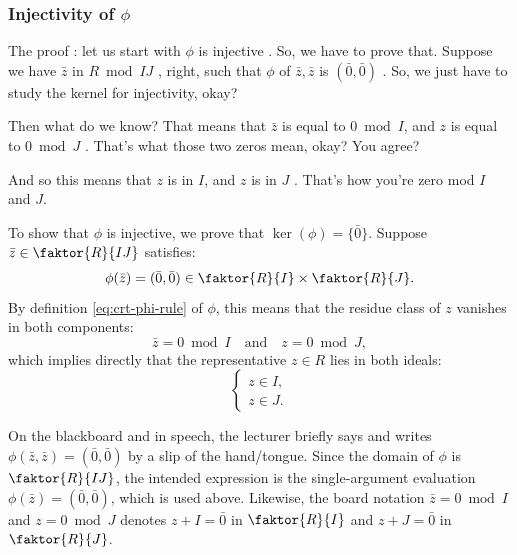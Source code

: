 \begin{proofWrapper}

\subsubsection{Injectivity of \texorpdfstring{$\phi$}{phi}}

\begin{speech}[00:05:59 - 00:07:08]
The proof : let us start with $\phi$ is injective . So, we have to prove that. Suppose we have $\bar{z}$ in $R \bmod IJ$ , right, such that $\phi$ of $\bar{z}, \bar{z}$ is $(\bar{0}, \bar{0})$ . So, we just have to study the kernel for injectivity, okay?

Then what do we know? That means that $\bar{z}$ is equal to $0 \bmod I$, and $z$ is equal to $0 \bmod J$ . That's what those two zeros mean, okay? You agree?

And so this means that $z$ is in $I$, and $z$ is in $J$ . That's how you're zero mod $I$ and $J$.
\end{speech}

\begin{content}
To show that $\phi$ is injective, we prove that $\ker(\phi) = \{\bar{0}\}$. Suppose $\bar{z} \in \faktor{R}{IJ}$ satisfies:
\[
\phi(\bar{z}) = (\bar{0}, \bar{0}) \in \faktor{R}{I} \times \faktor{R}{J}.
\]
By definition \eqref{eq:crt-phi-rule} of $\phi$, this means that the residue class of $z$ vanishes in both components:
\[
\bar{z} = 0 \bmod I \quad \text{and} \quad z = 0 \bmod J,
\]
which implies directly that the representative $z \in R$ lies in both ideals:
\begin{equation}\label{eq:z-in-i-and-j}
\begin{cases}
z \in I, \\
z \in J.
\end{cases}
\end{equation}
\end{content}

\begin{aiNote}
On the blackboard and in speech, the lecturer briefly says and writes $\phi(\bar{z}, \bar{z}) = (\bar{0}, \bar{0})$ by a slip of the hand/tongue. Since the domain of $\phi$ is $\faktor{R}{IJ}$, the intended expression is the single-argument evaluation $\phi(\bar{z}) = (\bar{0}, \bar{0})$, which is used above. Likewise, the board notation $\bar{z} = 0 \bmod I$ and $z = 0 \bmod J$ denotes $z + I = \bar{0}$ in $\faktor{R}{I}$ and $z + J = \bar{0}$ in $\faktor{R}{J}$.
\end{aiNote}


\end{proofWrapper}
